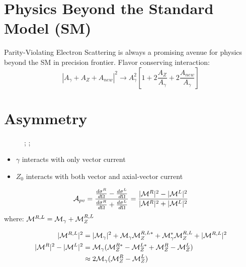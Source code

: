 \section{Physics Beyond the Standard Model (SM)} 
Parity-Violating Electron Scattering is always a promising avenue for physics
beyond the SM in precision frontier.
Flavor conserving interaction:
$$ |A_\gamma + A_Z + A_{new}|^2 \rightarrow A^2_\gamma\left[ 1 + 2\frac{A_Z}{A_\gamma}
 + 2\frac{A_{new}}{A_\gamma} \right]$$

\section{Asymmetry}
\begin{figure}[h]
    \centering
{};
;
\end{figure}

\begin{itemize}
    \item $\gamma$ interacts with only vector current
    \item $Z_0$ interacts with both vector and axial-vector current
\end{itemize}

\begin{equation*}
    \mathcal{A}_{pv} = \frac{\frac{d\sigma^R}{d\Omega} - \frac{d\sigma^L}{d\Omega}}{\frac{d\sigma^R}{d\Omega} + \frac{d\sigma^L}{d\Omega}} = \frac{|\mathcal{M}^R|^2 - |\mathcal{M}^L|^2}{|\mathcal{M}^R|^2 + |\mathcal{M}^L|^2}
\end{equation*}
where: $\mathcal{M}^{R, L} = \mathcal{M}_{\gamma} + \mathcal{M}_Z^{R,L}$

\begin{equation*}
    \begin{aligned}
	|\mathcal{M}^{R,L}|^2 &= |\mathcal{M}_\gamma|^2 + \mathcal{M}_\gamma\mathcal{M}_Z^{R,L*} + \mathcal{M}_\gamma^*\mathcal{M}_Z^{R,L} + |\mathcal{M}^{R,L}|^2	\\
	|\mathcal{M}^{R}|^2 - |\mathcal{M}^{L}|^2 &= \mathcal{M}_\gamma( \mathcal{M}_Z^{R*} - \mathcal{M}_Z^{L*} + \mathcal{M}_Z^{R} - \mathcal{M}_Z^L) \\
	&\approx 2\mathcal{M}_\gamma(\mathcal{M}_Z^R - \mathcal{M}_Z^L)
    \end{aligned}
\end{equation*}



